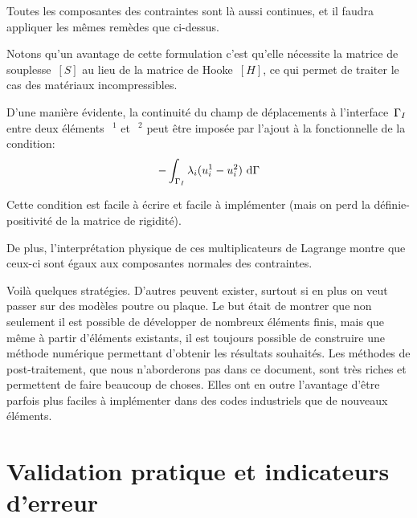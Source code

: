 \begin{description}
	Toutes les composantes des contraintes sont là aussi continues, et il faudra appliquer les mêmes remèdes que ci-dessus.

	Notons qu'un avantage de cette formulation c'est qu'elle nécessite la matrice de souplesse~$[S]$ au lieu de la matrice de Hooke~$[H]$, ce qui permet de traiter le cas des matériaux incompressibles. 
	
	\item[\textcolorblue{Multiplicateurs de Lagrange:}]
	
	D'une manière évidente, la continuité du champ de déplacements 	à l'interface~$\Gamma_I$ entre deux éléments~$~^1$ et~$~^2$ peut être imposée par l'ajout à la fonctionnelle de la condition: 
	\begin{equation} -\dint_{\li} \lambda_i(u_i^1-u_i^2)\ \dd\Gamma \end{equation}

	Cette condition est facile à écrire et facile à implémenter (mais on perd la 	définie-positivité de la matrice de rigidité).
	
	De plus, l'interprétation physique de ces multiplicateurs de Lagrange montre 	que ceux-ci sont égaux aux composantes normales des contraintes.
\end{description}
\medskip
Voilà quelques stratégies. D'autres peuvent exister, surtout si en plus on veut passer sur des modèles poutre ou plaque.
Le but était de montrer que non seulement il est possible de développer de nombreux éléments finis, mais que même à partir d'éléments existants, il est toujours possible de construire une méthode numérique permettant d'obtenir les résultats souhaités.
Les méthodes de post-traitement, que nous n'aborderons pas dans ce document, sont très riches et permettent de faire beaucoup de choses. Elles ont en outre l'avantage d'être parfois plus faciles à implémenter dans des codes industriels que de nouveaux éléments.

\medskip
\section{Validation pratique et indicateurs d'erreur}\label{Sec-ValidEF}

